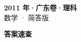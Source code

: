 \documentclass[zihao=-4, a4paper]{ctexart}
\begin{document}
\begin{center}
  {\Large\bfseries 2011 年·广东卷·理科}\\[4pt]
  {\large 数学 · 简答版}
\end{center}
\medskip
{}

\clearpage
{}
\begin{center}{\Large\bfseries 答案速查}\end{center}
\medskip

\end{document}
